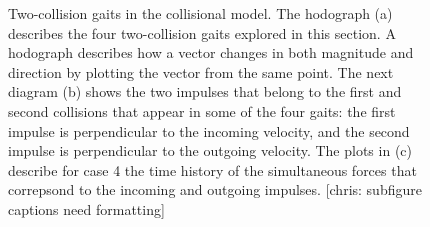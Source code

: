 \begin{figure}[h]		%
\begin{centering}
\end{centering}
\caption[Diagram and Figure:Two-Collision Gaits in the Collisional Model]{Two-collision gaits in the collisional model. The hodograph (a) describes the four two-collision gaits explored in this section. A hodograph describes how a vector changes in both magnitude and direction by plotting the vector from the same point. The next diagram (b) shows the two impulses that belong to the first and second collisions that appear in some of the four gaits: the first impulse is perpendicular to the incoming velocity, and the second impulse is perpendicular to the outgoing velocity. The plots in (c) describe for case 4 the time history of the simultaneous forces that correpsond to the incoming and outgoing impulses. [chris: subfigure captions need formatting]}
\label{fig:Ncollisional}
\end{figure}
%

